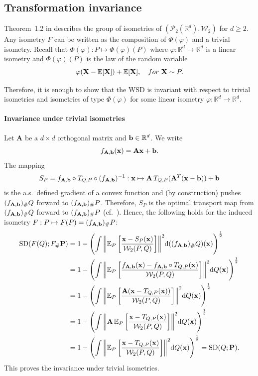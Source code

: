 \documentclass{imsart}
\numberwithin{equation}{section}
\def\R{\mathbb{R}}
\def\E{\mathbb{E}}
\def\x{\mathbf{x}}
\def\X{\mathbf{X}}
\def\A{\mathbf{A}}
\def\E{\mathbb E}
\def\x{\mathbf x}
\begin{document}
\subsection{Transformation invariance}
Theorem~1.2 in \cite{kloeckner2010geometric} describes the group of isometries of $(\mathcal{P}_2(\R^d),\mathcal{W}_2)$ for $d \ge 2$. Any isometry $F$ can be written as the composition of   $\Phi(\varphi)$
and a trivial isometry. Recall that $\Phi(\varphi):P\mapsto \Phi(\varphi)(P)$  where $\varphi:\R^d\to \R^d$ is a linear isometry and $\Phi(\varphi)(P)$ is the
law of the random variable 
$$ \varphi(\X-\E[\X])+\E[\X], \quad {\rm for
}\ \X\sim P . $$

Therefore, it is enough to show that the WSD is invariant with respect to trivial isometries and isometries of type $\Phi(\varphi)$ for some linear isometry $\varphi:\R^d\to \R^d$.

\paragraph*{Invariance under trivial isometries}
Let  $\A$ be a $d\times d$ orthogonal matrix and ${\bf b}\in \R^d$. We write 
$$ f_{\A,{\bf b}}(\x)=\A\x+{\bf b}.   $$
The mapping
$$ S_P=f_{\A,{\bf b}} \circ T_{Q,P} \circ (f_{\A,{\bf b}})^{-1}:\x\mapsto  \A\, T_{Q,P}(\A^T(\x-{\bf b}) ) +{\bf b}$$
is the a.s.\ defined gradient of a convex function and (by construction) pushes $(f_{\A,{\bf b}})_\# Q $ forward to $(f_{\A,{\bf b}})_\# P $. 
Therefore, $S_P$ is the optimal transport map from  $(f_{\A,{\bf b}})_\# Q $ forward to $(f_{\A,{\bf b}})_\# P $ (cf.\ \cite{McCann}). 
Hence, the following holds for the induced isometry $F:P\mapsto F(P)=(f_{\A,{\bf b}})_{\#} P$:
\begin{align*}
	\mathrm{SD}(F(Q); F_\# {\bf P})&=1-  \left(\int{ \left\|\E_{P}\left[  \frac{\x-S_P(\x)}{\mathcal{W}_2(P,Q)}\right]\right\|^2} \mathrm{d}((f_{\A,{\bf b}})_{\#} Q)(\x)\right)^{\frac{1}{2}}\\
	&=1-  \left(\int{ \left\|\E_{P}\left[  \frac{f_{\A,{\bf b}}(\x)-f_{\A,{\bf b}} \circ T_{Q,P}(\x) }{\mathcal{W}_2(P,Q)}\right]\right\|^2} \mathrm{d}Q(\x)\right)^{\frac{1}{2}}\\
	&=1-  \left(\int{ \left\|\E_{P}\left[  \frac{\A(\x- T_{Q,P}(\x)) }{\mathcal{W}_2(P,Q)}\right]\right\|^2} \mathrm{d}Q(\x)\right)^{\frac{1}{2}}\\
	&=1-  \left(\int{ \left\|\A\,\E_{P}\left[  \frac{\x- T_{Q,P}(\x) }{\mathcal{W}_2(P,Q)}\right]\right\|^2} \mathrm{d}Q(\x)\right)^{\frac{1}{2}}\\
	&=1-  \left(\int{ \left\|\E_{P}\left[  \frac{\x- T_{Q,P}(\x) }{\mathcal{W}_2(P,Q)}\right]\right\|^2} \mathrm{d}Q(\x)\right)^{\frac{1}{2}}=\mathrm{SD}(Q;  {\bf P}).
\end{align*}
This proves the invariance  under trivial isometries.
\end{document}
